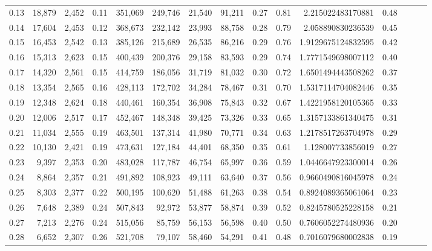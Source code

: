 \begin{tabular}{rrrrrrrrrrrrrrr}
0.13 &  18,879 &  2,452 &  0.11 &  351,069 &  249,746 &   21,540 &   91,211 &  0.27 &  0.81 &       2.215022483170881 &      0.48 \\
0.14 &  17,604 &  2,453 &  0.12 &  368,673 &  232,142 &   23,993 &   88,758 &  0.28 &  0.79 &       2.058890830236539 &      0.45 \\
0.15 &  16,453 &  2,542 &  0.13 &  385,126 &  215,689 &   26,535 &   86,216 &  0.29 &  0.76 &      1.9129675124832595 &      0.42 \\
0.16 &  15,313 &  2,623 &  0.15 &  400,439 &  200,376 &   29,158 &   83,593 &  0.29 &  0.74 &      1.7771549698007112 &      0.40 \\
0.17 &  14,320 &  2,561 &  0.15 &  414,759 &  186,056 &   31,719 &   81,032 &  0.30 &  0.72 &      1.6501494443508262 &      0.37 \\
0.18 &  13,354 &  2,565 &  0.16 &  428,113 &  172,702 &   34,284 &   78,467 &  0.31 &  0.70 &      1.5317114704082446 &      0.35 \\
0.19 &  12,348 &  2,624 &  0.18 &  440,461 &  160,354 &   36,908 &   75,843 &  0.32 &  0.67 &      1.4221958120105365 &      0.33 \\
0.20 &  12,006 &  2,517 &  0.17 &  452,467 &  148,348 &   39,425 &   73,326 &  0.33 &  0.65 &      1.3157133861340475 &      0.31 \\
0.21 &  11,034 &  2,555 &  0.19 &  463,501 &  137,314 &   41,980 &   70,771 &  0.34 &  0.63 &      1.2178517263704978 &      0.29 \\
0.22 &  10,130 &  2,421 &  0.19 &  473,631 &  127,184 &   44,401 &   68,350 &  0.35 &  0.61 &       1.128007733856019 &      0.27 \\
0.23 &   9,397 &  2,353 &  0.20 &  483,028 &  117,787 &   46,754 &   65,997 &  0.36 &  0.59 &      1.0446647923300014 &      0.26 \\
0.24 &   8,864 &  2,357 &  0.21 &  491,892 &  108,923 &   49,111 &   63,640 &  0.37 &  0.56 &      0.9660490816045978 &      0.24 \\
0.25 &   8,303 &  2,377 &  0.22 &  500,195 &  100,620 &   51,488 &   61,263 &  0.38 &  0.54 &      0.8924089365061064 &      0.23 \\
0.26 &   7,648 &  2,389 &  0.24 &  507,843 &   92,972 &   53,877 &   58,874 &  0.39 &  0.52 &      0.8245780525228158 &      0.21 \\
0.27 &   7,213 &  2,276 &  0.24 &  515,056 &   85,759 &   56,153 &   56,598 &  0.40 &  0.50 &      0.7606052274480936 &      0.20 \\
0.28 &   6,652 &  2,307 &  0.26 &  521,708 &   79,107 &   58,460 &   54,291 &  0.41 &  0.48 &      0.7016079680002838 &      0.19 \\

\end{tabular}
